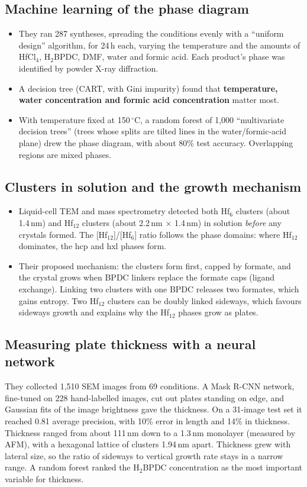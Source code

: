 \documentclass[11pt,a4paper]{article}
\theoremstyle{remark}\newtheorem*{example}{Worked example}
\begin{document}
\subsection{Machine learning of the phase diagram}
\begin{itemize}
\item They ran 287 syntheses, spreading the conditions evenly with a ``uniform design'' algorithm, for 24\,h each, varying the temperature and the amounts of HfCl$_4$, H$_2$BPDC, DMF, water and formic acid. Each product's phase was identified by powder X-ray diffraction.
\item A decision tree (CART, with Gini impurity) found that \textbf{temperature, water concentration and formic acid concentration} matter most.
\item With temperature fixed at 150\,$^\circ$C, a random forest of 1,000 ``multivariate decision trees'' (trees whose splits are tilted lines in the water/formic-acid plane) drew the phase diagram, with about 80\% test accuracy. Overlapping regions are mixed phases.
\end{itemize}

\subsection{Clusters in solution and the growth mechanism}
\begin{itemize}
\item Liquid-cell TEM and mass spectrometry detected both Hf$_6$ clusters (about 1.4\,nm) and Hf$_{12}$ clusters (about 2.2\,nm $\times$ 1.4\,nm) in solution \emph{before} any crystals formed. The [Hf$_{12}$]/[Hf$_6$] ratio follows the phase domains: where Hf$_{12}$ dominates, the hcp and hxl phases form.
\item Their proposed mechanism: the clusters form first, capped by formate, and the crystal grows when BPDC linkers replace the formate caps (ligand exchange). Linking two clusters with one BPDC releases two formates, which gains entropy. Two Hf$_{12}$ clusters can be doubly linked sideways, which favours sideways growth and explains why the Hf$_{12}$ phases grow as plates.
\end{itemize}

\subsection{Measuring plate thickness with a neural network}
They collected 1,510 SEM images from 69 conditions. A Mask R-CNN network, fine-tuned on 228 hand-labelled images, cut out plates standing on edge, and Gaussian fits of the image brightness gave the thickness. On a 31-image test set it reached 0.81 average precision, with 10\% error in length and 14\% in thickness. Thickness ranged from about 111\,nm down to a 1.3\,nm monolayer (measured by AFM), with a hexagonal lattice of clusters 1.94\,nm apart. Thickness grew with lateral size, so the ratio of sideways to vertical growth rate stays in a narrow range. A random forest ranked the H$_2$BPDC concentration as the most important variable for thickness.
\end{document}
